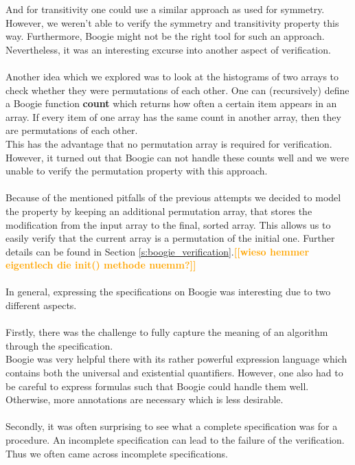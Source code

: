 \documentclass{report}
\newcommand{\todo}[1]{\textsf{\textbf{\textcolor{orange}{[[#1]]}}}}
\begin{document}
And for transitivity one could use a similar approach as used for symmetry.\\
However, we weren't able to verify the symmetry and transitivity property this way.
Furthermore, Boogie might not be the right tool for such an approach.
Nevertheless, it was an interesting excurse into another aspect of verification.
\\
\\
Another idea which we explored was to look at the histograms of two arrays to
check whether they were permutations of each other. One can (recursively) define a
Boogie function \textbf{count} which returns how often a certain item appears in an 
array. If every item of one array has the same count in another array, then they
are permutations of each other.\\
This has the advantage that no permutation array is required for verification.\\
However, it turned out that Boogie can not handle these counts well and we were
unable to verify the permutation property with this approach.
\\
\\
Because of the mentioned pitfalls of the previous attempts we decided to model the property by keeping an additional permutation array, that stores the modification from the input array to the final, sorted array. This allows us to easily verify that the current array is a permutation of the initial one. Further details can be found in Section \ref{s:boogie_verification}.\todo{wieso hemmer eigentlech die init() methode nuemm?}
\\\\
In general, expressing the specifications on Boogie was interesting due to two different aspects.
\\
\\
Firstly, there was the challenge to fully capture the meaning of an algorithm
through the specification.\\
Boogie was very helpful there with its rather powerful expression language which
contains both the universal and existential quantifiers.
However, one also had to be careful to express formulas such that Boogie could
handle them well. Otherwise, more annotations are necessary which is less desirable.
\\
\\
Secondly, it was often surprising to see what a complete specification was for a procedure.
An incomplete specification can lead to the failure of the verification.
Thus we often came across incomplete specifications.\\
\end{document}
